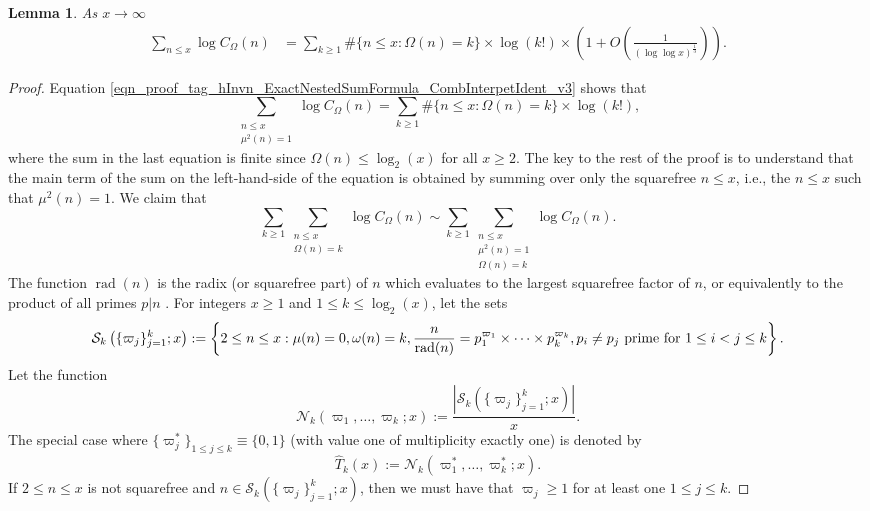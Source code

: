 \documentclass[11pt,reqno,a4letter]{article}
\numberwithin{equation}{section}
\numberwithin{figure}{section}
\numberwithin{table}{section}
\newcommand{\seqnum}[1]{\href{http://oeis.org/#1}{\color{ProcessBlue}{\underline{#1}}}}
\theoremstyle{plain}
\newtheorem{lemma}[theorem]{Lemma}
\numberwithin{theorem}{section}
\theoremstyle{definition}
\theoremstyle{remark}
\newcommand{\mathtext}[1]{\text{\rm #1}}
\begin{document}
\begin{lemma}
\label{lemma_eqn_proof_tag_SumLogCOmegan_P0_exp_v1}
As $x \rightarrow \infty$  
\begin{align}
\label{eqn_proof_tag_SumLogCOmegan_P0_exp_v1}
\sum_{n \leq x} \log C_{\Omega}(n) & = 
	\sum_{k \geq 1} \#\{n \leq x: \Omega(n)=k\} \times \log(k!) \times 
     \left(1 + O\left(\frac{1}{(\log\log x)^{\frac{1}{3}}}\right)\right). 
\end{align}
\end{lemma}
\begin{proof}
Equation \eqref{eqn_proof_tag_hInvn_ExactNestedSumFormula_CombInterpetIdent_v3} shows that 
\[
\sum_{\substack{n \leq x \\ \mu^2(n)=1}} \log C_{\Omega}(n) = 
	\sum_{k \geq 1} \#\{n \leq x: \Omega(n)=k\} \times \log(k!), 
\]
where the sum in the last equation is finite since $\Omega(n) \leq \log_2(x)$ 
for all $x \geq 2$. 
The key to the rest of the proof is to understand that the main term of the 
sum on the left-hand-side of the equation is obtained by summing over only 
the squarefree $n \leq x$, i.e., the $n \leq x$ such that $\mu^2(n) = 1$. 
We claim that 
\[
\sum_{k \geq 1} \sum_{\substack{n \leq x \\ \Omega(n)=k}} \log C_{\Omega}(n) \sim 
	\sum_{k \geq 1} \sum_{\substack{n \leq x \\ \mu^2(n) = 1 \\ \Omega(n)=k}} \log C_{\Omega}(n). 
\]
The function $\operatorname{rad}(n)$ is the radix (or squarefree part) of $n$ which evaluates 
to the largest squarefree factor of $n$, 
or equivalently to the product of all primes $p | n$ 
\cite[\seqnum{A007913}]{OEIS}. 
For integers $x \geq 1$ and $1 \leq k \leq \log_2(x)$, let the sets 
\[
\mathcal{S}_k\left(\{\varpi_j\}_{j=1}^k; x\right) := \left\{2 \leq n \leq x: \mu(n) = 0, \omega(n) = k, 
	\frac{n}{\operatorname{rad}(n)} = p_1^{\varpi_1} \times \cdots \times p_k^{\varpi_k}, 
	\mathtext{ $p_i \neq p_j$ prime for $1 \leq i < j \leq k$}\right\}. 
\]
Let the function 
$$\mathcal{N}_k(\varpi_1, \ldots, \varpi_k; x) := 
  \frac{\left\lvert \mathcal{S}_k\left(\{\varpi_j\}_{j=1}^k; x\right) \right\rvert}{x}.$$ 
The special case where $\{\varpi_j^{\ast}\}_{1 \leq j \leq k} \equiv \{0, 1\}$ 
(with value one of multiplicity exactly one) is denoted by 
$$\widehat{T}_k(x) := \mathcal{N}_k\left(\varpi_1^{\ast}, \ldots, \varpi_k^{\ast}; x\right).$$ 
If $2 \leq n \leq x$ is not squarefree and $n \in \mathcal{S}_k\left(\{\varpi_j\}_{j=1}^k; x\right)$, then 
we must have that $\varpi_j \geq 1$ for at least one $1 \leq j \leq k$. 

\end{proof}
\end{document}
